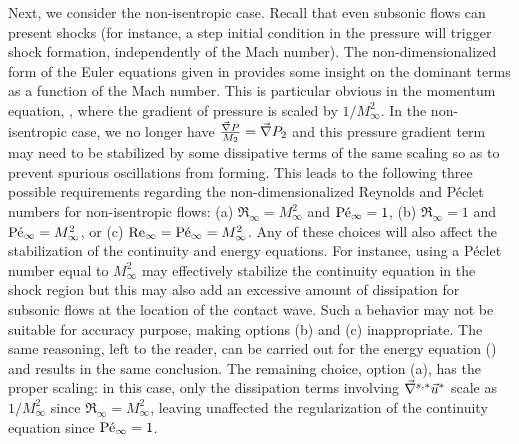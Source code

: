 Next, we consider the non-isentropic case. Recall that even subsonic flows can present shocks (for instance, a step initial condition in the pressure will trigger shock formation, independently of the Mach number). The non-dimensionalized form of the Euler equations given in  provides some insight on the dominant terms as a function of the Mach number. This is particular obvious in the momentum equation, , where the gradient of pressure is scaled by $1/M_\infty^2$. In the non-isentropic case, we no longer have $\frac{\vec{\nabla} P}{M_2}=\vec{\nabla} P_2$ and this pressure gradient term may need to be stabilized by some dissipative terms of the same scaling so as to prevent spurious oscillations from forming. This leads to the following three possible requirements regarding the non-dimensionalized Reynolds and P\'eclet numbers for non-isentropic flows: 
(a) $\Re_\infty = M_\infty^2$ and $\textrm{P\'e}_\infty = 1$,
(b) $\Re_\infty = 1$ and $\textrm{P\'e}_\infty = M_\infty^2$, or
(c) $\textrm{Re}_\infty = \textrm{P\'e}_\infty = M_\infty^2$. 
%
Any of these choices will also affect the stabilization of the continuity and energy equations. For instance, using a P\'eclet number equal to $M_\infty^2$ may effectively stabilize the continuity equation in the shock region but this may also add an excessive amount of dissipation for subsonic flows at the location of the contact wave. Such a behavior may not be suitable for accuracy purpose, making options (b) and (c) inappropriate. The same reasoning, left to the reader, can be carried out for the energy equation () and results in the same conclusion. The remaining choice, option (a), has the proper scaling: in this case, only the dissipation terms involving $\vec{\nabla}^{s,*} \vec{u}^*$ scale as $1/M_\infty^2$ since $\Re_\infty = M_\infty^2$, leaving unaffected the regularization of the continuity equation since $\textrm{P\'e}_\infty = 1$.
%
%
%
%

